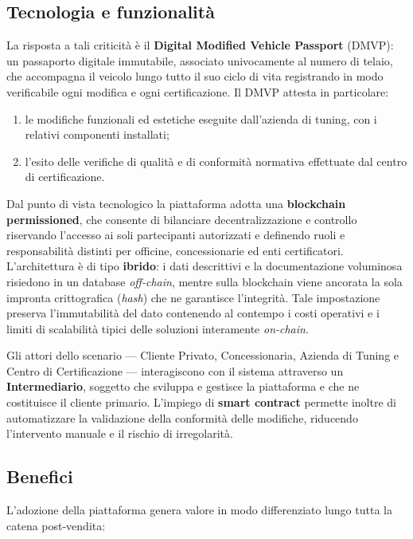 \subsection*{Tecnologia e funzionalit\`a}

La risposta a tali criticit\`a \`e il \textbf{Digital Modified Vehicle Passport} (DMVP): un passaporto digitale immutabile, associato univocamente al numero di telaio, che accompagna il veicolo lungo tutto il suo ciclo di vita registrando in modo verificabile ogni modifica e ogni certificazione. Il DMVP attesta in particolare:

\begin{enumerate}
    \item le modifiche funzionali ed estetiche eseguite dall'azienda di tuning, con i relativi componenti installati;
    \item l'esito delle verifiche di qualit\`a e di conformit\`a normativa effettuate dal centro di certificazione.
\end{enumerate}

Dal punto di vista tecnologico la piattaforma adotta una \textbf{blockchain permissioned}, che consente di bilanciare decentralizzazione e controllo riservando l'accesso ai soli partecipanti autorizzati e definendo ruoli e responsabilit\`a distinti per officine, concessionarie ed enti certificatori. L'architettura \`e di tipo \textbf{ibrido}: i dati descrittivi e la documentazione voluminosa risiedono in un database \textit{off-chain}, mentre sulla blockchain viene ancorata la sola impronta crittografica (\textit{hash}) che ne garantisce l'integrit\`a. Tale impostazione preserva l'immutabilit\`a del dato contenendo al contempo i costi operativi e i limiti di scalabilit\`a tipici delle soluzioni interamente \textit{on-chain}.

Gli attori dello scenario --- Cliente Privato, Concessionaria, Azienda di Tuning e Centro di Certificazione --- interagiscono con il sistema attraverso un \textbf{Intermediario}, soggetto che sviluppa e gestisce la piattaforma e che ne costituisce il cliente primario. L'impiego di \textbf{smart contract} permette inoltre di automatizzare la validazione della conformit\`a delle modifiche, riducendo l'intervento manuale e il rischio di irregolarit\`a.

\subsection*{Benefici}

L'adozione della piattaforma genera valore in modo differenziato lungo tutta la catena post-vendita:

